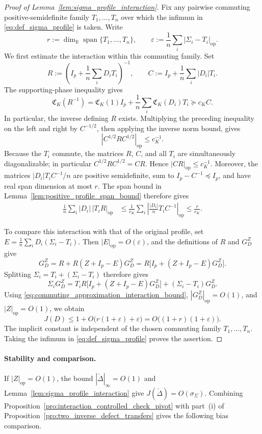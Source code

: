 \documentclass[EJP, preprint, NODS, nobera, nofontexpansion]{ejpecp}
\DeclareMathOperator{\op}{op}
\begin{document}
\begin{proof}[Proof of Lemma~\ref{lem:sigma_profile_interaction}]
Fix any pairwise commuting positive-semidefinite family
$T_1,\ldots,T_n$ over which the infimum in
\eqref{eq:def_sigma_profile} is taken. Write
\[
 r:=\dim_{\mathbb R}\operatorname{span}\{T_1,\ldots,T_n\},
 \qquad
 \varepsilon:=\frac1n\sum_i|\Sigma_i-T_i|_{\op}.
\]
We first estimate the interaction within this commuting family.  Set
\[
 R:=\left(I_p+\frac1n\sum_iD_iT_i\right)^{-1},
 \qquad
 C:=I_p+\frac1n\sum_i|D_i|T_i.
\]
The supporting-phase inequality gives
\[
 \mathfrak C_K(R^{-1})
 =\mathfrak C_K(1)I_p
  +\frac1n\sum_i\mathfrak C_K(D_i)T_i
 \succeq c_KC.
\]
In particular, the inverse defining \(R\) exists.
Multiplying the preceding inequality on the left and right by
\(C^{-1/2}\), then applying the inverse norm bound, gives
\[
 |C^{1/2}RC^{1/2}|_{\op}\leq c_K^{-1}.
\]
Because the $T_i$ commute, the matrices $R$, $C$, and all $T_i$ are
simultaneously diagonalizable; in particular
$C^{1/2}RC^{1/2}=CR$. Hence $|CR|_{\op}\leq c_K^{-1}$.
Moreover, the matrices $|D_i|T_iC^{-1}/n$ are positive semidefinite,
sum to $I_p-C^{-1}\preceq I_p$, and have real span dimension at most
$r$.  The span bound in Lemma~\ref{lem:positive_profile_span_bound}
therefore gives
\begin{align}\label{eq:commuting_approximation_interaction_bound}
 \frac1n\sum_i|D_i|\,|T_iR|_{\op}
 &\leq\frac1{c_K}
       \sum_i\left|\frac{|D_i|}{n}T_iC^{-1}\right|_{\op}
 \leq\frac r{c_K}.
\end{align}

To compare this interaction with that of the original profile, set
$E=\frac1n\sum_iD_i(\Sigma_i-T_i)$.  Then
$|E|_{\op}=O(\varepsilon)$, and the definitions of $R$ and $G_D^Z$ give
\[
 G_D^Z=R+R(Z+I_p-E)G_D^Z
      =R\bigl[I_p+(Z+I_p-E)G_D^Z\bigr].
\]
Splitting $\Sigma_i=T_i+(\Sigma_i-T_i)$ therefore gives
\[
 \Sigma_iG_D^Z
 =T_iR\bigl[I_p+(Z+I_p-E)G_D^Z\bigr]+(\Sigma_i-T_i)G_D^Z.
\]
Using \eqref{eq:commuting_approximation_interaction_bound},
$|G_D^Z|_{\op}=O(1)$, and $|Z|_{\op}=O(1)$, we obtain
\[
 J(D)\leq1+O\bigl(r(1+\varepsilon)+\varepsilon\bigr)
       =O\bigl((1+r)(1+\varepsilon)\bigr).
\]
The implicit constant is independent of the chosen commuting family
\(T_1,\ldots,T_n\). Taking the infimum in
\eqref{eq:def_sigma_profile} proves the assertion.
\end{proof}

\paragraph{Stability and comparison.}
If $|Z|_{\op}=O(1)$, the bound $|\check\Delta|_\infty=O(1)$ and
Lemma~\ref{lem:sigma_profile_interaction} give
$J(\check\Delta)=O(\sigma_\Sigma)$.
Combining Proposition~\ref{pro:interaction_controlled_check_pivot}
with part~\textnormal{(i)} of
Proposition~\ref{pro:two_inverse_defect_transfers}
gives the following bias comparison.
\end{document}
